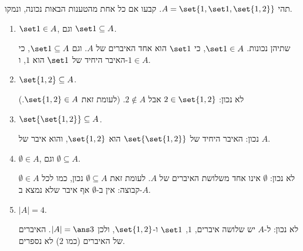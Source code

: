 תהי $A=\set{1,\set1,\set{1,2}}$. קבעו אם כל אחת מהטענות הבאות נכונה, ונמקו.
\begin{enumerate}
\item $\set1\in A$, וגם $\set1\subseteq A$.
\begin{solbox}
שתיהן נכונות. $\set1\in A$, כי $\set1$ הוא אחד האיברים של $A$. וגם $\set1\subseteq A$, כי האיבר היחיד של $\set1$ הוא $1$, ו-$1\in A$.
\end{solbox}
\item $\set{1,2}\subseteq A$.
\begin{solbox}
לא נכון: $2\in\set{1,2}$ אבל $2\notin A$. (לעומת זאת $\set{1,2}\in A$.)
\end{solbox}
\item $\set{\set{1,2}}\subseteq A$.
\begin{solbox}
נכון: האיבר היחיד של $\set{\set{1,2}}$ הוא $\set{1,2}$, והוא איבר של $A$.
\end{solbox}
\item $\emptyset\in A$, וגם $\emptyset\subseteq A$.
\begin{solbox}
$\emptyset\in A$ לא נכון: $\emptyset$ אינו אחד משלושת האיברים של $A$. לעומת זאת $\emptyset\subseteq A$ נכון, כמו לכל קבוצה: אין ב-$\emptyset$ אף איבר שלא נמצא ב-$A$.
\end{solbox}
\item $|A|=4$.
\begin{solbox}
לא נכון: ל-$A$ יש שלושה איברים, $1$, $\set1$ ו-$\set{1,2}$, ולכן $|A|=\ans3$. האיברים של האיברים (כמו $2$) לא נספרים.
\end{solbox}
\end{enumerate}
